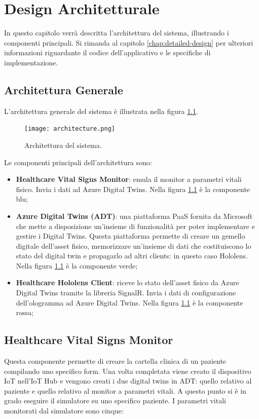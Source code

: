 \chapter{Design Architetturale}
\label{chap:architectural-design}
In questo capitolo verrà descritta l'architettura del sistema, illustrando i componenti principali. Si rimanda al capitolo \ref{chap:detailed-design} per ulteriori informazioni riguardante il codice dell'applicativo e le specifiche di implementazione.

\section{Architettura Generale}
L'architettura generale del sistema è illustrata nella figura \ref{pic:architecture}.

\begin{figure}[ht]
    \texttt{[image: architecture.png]}
    \centering
    \caption{\label{pic:architecture}Architettura del sistema.}
\end{figure}

Le componenti principali dell'architettura sono:

\begin{itemize}
    \item \textbf{Healthcare Vital Signs Monitor}: emula il monitor a parametri vitali fisico. Invia i dati ad Azure Digital Twins. Nella figura \ref{pic:architecture} è la componente blu;
    
    \item \textbf{Azure Digital Twins (ADT)}: una piattaforma PaaS fornita da Microsoft che mette a disposizione un'insieme di funzionalità per poter implementare e gestire i Digital Twins. Questa piattaforma permette di creare un gemello digitale dell'asset fisico, memorizzare un'insieme di dati che costituiscono lo stato del digital twin e propagarlo ad altri clients: in questo caso Hololens. Nella figura \ref{pic:architecture} è la componente verde;
    
    \item \textbf{Healthcare Hololens Client}: riceve lo stato dell'asset fisico da Azure Digital Twins tramite la libreria SignalR. Invia i dati di configurazione dell'ologramma ad Azure Digital Twins. Nella figura \ref{pic:architecture} è la componente rossa;  
\end{itemize}

\section{Healthcare Vital Signs Monitor}
Questa componente permette di creare la cartella clinica di un paziente compilando uno specifico form. Una volta completata viene creato il dispositivo IoT nell'IoT Hub e vengono creati i due digital twins in ADT: quello relativo al paziente e quello relativo al monitor a parametri vitali. A questo punto si è in grado eseguire il simulatore su uno specifico paziente. I parametri vitali monitorati dal simulatore sono cinque:

